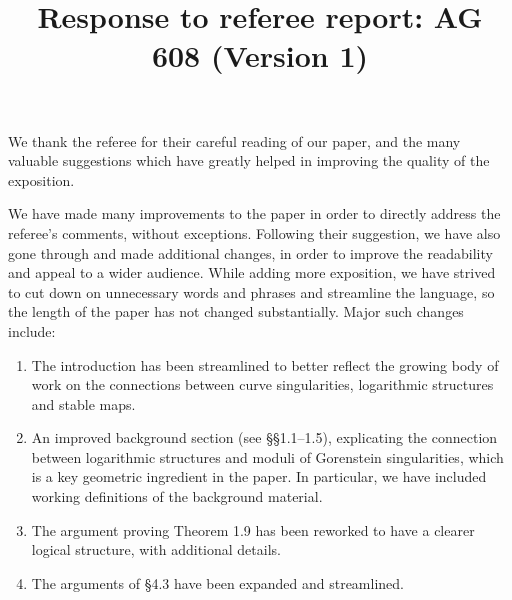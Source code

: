 \documentclass[11pt]{amsart}
\theoremstyle{plain}
\theoremstyle{remark}
\theoremstyle{definition}
\begin{document}
 
\title{Response to referee report: AG 608 (Version 1)}
\maketitle

\noindent We thank the referee for their careful reading of our paper, and the many valuable suggestions which have greatly helped in improving the quality of the exposition.

We have made many improvements to the paper in order to directly address the referee's comments, without exceptions. Following their suggestion, we have also gone through and made additional changes, in order to improve the readability and appeal to a wider audience. While adding more exposition, we have strived to cut down on unnecessary words and phrases and streamline the language, so the length of the paper has not changed substantially. Major such changes include:
\begin{enumerate}
	\item The introduction has been streamlined to better reflect the growing body of work on the connections between curve singularities, logarithmic structures and stable maps.
	\item An improved background section (see \S\S 1.1--1.5), explicating the connection between logarithmic structures and moduli of Gorenstein singularities, which is a key geometric ingredient in the paper. In particular, we have included working definitions of the background material. 
	\item The argument proving Theorem 1.9 has been reworked to have a clearer logical structure, with additional details. 
	\item The arguments of \S 4.3 have been expanded and streamlined.
\end{enumerate}
\end{document}
